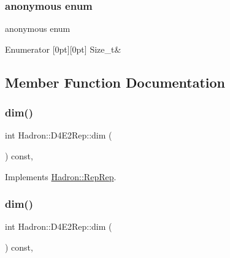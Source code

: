 \subsubsection{\texorpdfstring{anonymous enum}{anonymous enum}}
{\footnotesize\ttfamily anonymous enum}

\begin{DoxyEnumFields}{Enumerator}
[0pt][0pt]{}\mbox{\label{structHadron_1_1D4E2Rep_af1fe3f391dd9af6725ec9cf2297d8eeeabd9704db250d05eab94bc3444f7411c3}} 
Size\+\_\+t&\\
\hline

\end{DoxyEnumFields}


\subsection{Member Function Documentation}
\mbox{\label{structHadron_1_1D4E2Rep_a4c70a287724e1537c34e7795797f2f09}} 
\subsubsection{\texorpdfstring{dim()}{dim()}\hspace{0.1cm}{\footnotesize\ttfamily [1/5]}}
{\footnotesize\ttfamily int Hadron\+::\+D4\+E2\+Rep\+::dim (\begin{DoxyParamCaption}{ }\end{DoxyParamCaption}) const\hspace{0.3cm}{\ttfamily [inline]}, {\ttfamily [virtual]}}



Implements \mbox{\hyperlink{structHadron_1_1RepRep_a92c8802e5ed7afd7da43ccfd5b7cd92b}{Hadron\+::\+Rep\+Rep}}.

\mbox{\label{structHadron_1_1D4E2Rep_a4c70a287724e1537c34e7795797f2f09}} 
\subsubsection{\texorpdfstring{dim()}{dim()}\hspace{0.1cm}{\footnotesize\ttfamily [2/5]}}
{\footnotesize\ttfamily int Hadron\+::\+D4\+E2\+Rep\+::dim (\begin{DoxyParamCaption}{ }\end{DoxyParamCaption}) const\hspace{0.3cm}{\ttfamily [inline]}, {\ttfamily [virtual]}}



